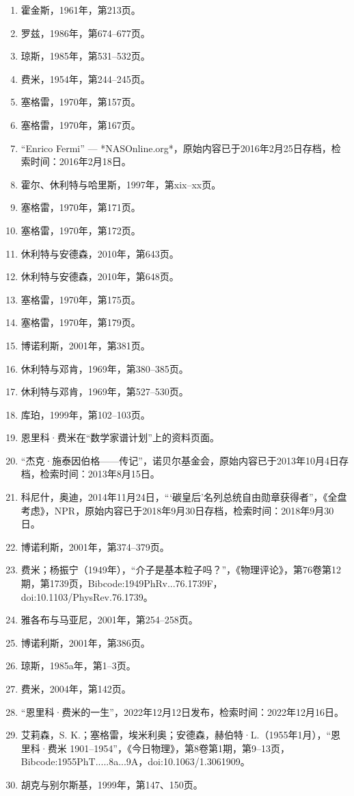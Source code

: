 \begin{enumerate}
\item 霍金斯，1961年，第213页。
\item 罗兹，1986年，第674–677页。
\item 琼斯，1985年，第531–532页。
\item 费米，1954年，第244–245页。
\item 塞格雷，1970年，第157页。
\item 塞格雷，1970年，第167页。
\item “Enrico Fermi” — *NASOnline.org*，原始内容已于2016年2月25日存档，检索时间：2016年2月18日。
\item 霍尔、休利特与哈里斯，1997年，第xix–xx页。
\item 塞格雷，1970年，第171页。
\item 塞格雷，1970年，第172页。
\item 休利特与安德森，2010年，第643页。
\item 休利特与安德森，2010年，第648页。
\item 塞格雷，1970年，第175页。
\item 塞格雷，1970年，第179页。
\item 博诺利斯，2001年，第381页。
\item 休利特与邓肯，1969年，第380–385页。
\item 休利特与邓肯，1969年，第527–530页。
\item 库珀，1999年，第102–103页。
\item 恩里科·费米在“数学家谱计划”上的资料页面。
\item “杰克·施泰因伯格——传记”，诺贝尔基金会，原始内容已于2013年10月4日存档，检索时间：2013年8月15日。
\item 科尼什，奥迪，2014年11月24日，“‘碳皇后’名列总统自由勋章获得者”，《全盘考虑》，NPR，原始内容已于2018年9月30日存档，检索时间：2018年9月30日。
\item 博诺利斯，2001年，第374–379页。
\item 费米；杨振宁（1949年），“介子是基本粒子吗？”，《物理评论》，第76卷第12期，第1739页，Bibcode:1949PhRv...76.1739F，doi:10.1103/PhysRev.76.1739。
\item 雅各布与马亚尼，2001年，第254–258页。
\item 博诺利斯，2001年，第386页。
\item 琼斯，1985a年，第1–3页。
\item 费米，2004年，第142页。
\item “恩里科·费米的一生”，2022年12月12日发布，检索时间：2022年12月16日。
\item 艾莉森，S. K.；塞格雷，埃米利奥；安德森，赫伯特·L.（1955年1月），“恩里科·费米 1901–1954”，《今日物理》，第8卷第1期，第9–13页，Bibcode:1955PhT.....8a...9A，doi:10.1063/1.3061909。
\item 胡克与别尔斯基，1999年，第147、150页。
\end{enumerate}
